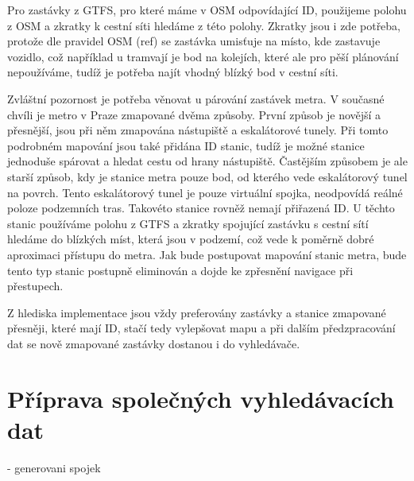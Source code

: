 Pro zastávky z GTFS, pro které máme v OSM odpovídající ID, použijeme polohu z
OSM a zkratky k cestní síti hledáme z této polohy. Zkratky jsou i zde potřeba,
protože dle pravidel OSM (\TODO ref) se zastávka umisťuje na místo, kde zastavuje
vozidlo, což například u tramvají je bod na kolejích, které ale pro pěší
plánování nepoužíváme, tudíž je potřeba najít vhodný blízký bod v cestní síti.

Zvláštní pozornost je potřeba věnovat u párování zastávek metra. V současné
chvíli je metro v Praze zmapované dvěma způsoby. První způsob je novější a
přesnější, jsou při něm zmapována nástupiště a eskalátorové tunely. Při tomto
podrobném mapování jsou také přidána ID stanic, tudíž je možné stanice jednoduše
spárovat a hledat cestu od hrany nástupiště. Častějším způsobem je ale starší
způsob, kdy je stanice metra pouze bod, od kterého vede eskalátorový tunel na
povrch. Tento eskalátorový tunel je pouze virtuální spojka, neodpovídá reálné
poloze podzemních tras. Takovéto stanice rovněž nemají přiřazená ID. U těchto
stanic používáme polohu z GTFS a zkratky spojující zastávku s cestní sítí
hledáme do blízkých míst, která jsou v podzemí, což vede k poměrně dobré
aproximaci přístupu do metra. Jak bude postupovat mapování stanic metra, bude
tento typ stanic postupně eliminován a dojde ke zpřesnění navigace při
přestupech.

Z hlediska implementace jsou vždy preferovány zastávky a stanice zmapované
přesněji, které mají ID, stačí tedy vylepšovat mapu a při dalším předzpracování
dat se nově zmapované zastávky dostanou i do vyhledávače.

\section{Příprava společných vyhledávacích dat}
    - generovani spojek
